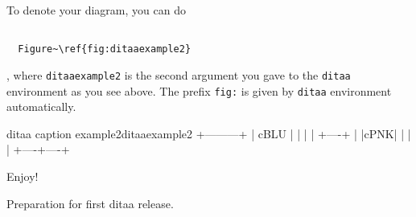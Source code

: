 \documentclass[pagesize=auto]{scrartcl}
\begin{document}
To denote your diagram, you can do

\begin{verbatim}

  Figure~\ref{fig:ditaaexample2}

\end{verbatim}

, where \texttt{ditaaexample2} is the second argument you gave to the \texttt{ditaa} environment as you see above.
The prefix \texttt{fig:} is given by \texttt{ditaa} environment automatically.

\begin{ditaa}[6cm]{ditaa caption example2}{ditaaexample2}
  +---------+
  | cBLU    |
  |         |
  |    +----+
  |    |cPNK|
  |    |    |
  +----+----+
\end{ditaa}

Enjoy!

%
\begin{labeling}[\hspace{\labelsep}--]{0.9}
\item[0.9] Preparation for first \textsf{ditaa} release.
\end{labeling}
\end{document}
